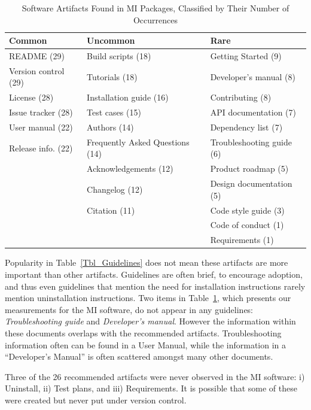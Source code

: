 \documentclass[draft, 12pt, 3p, times]{elsarticle} %
\begin{document}
\begin{table}[ht!]
    \caption{Software Artifacts Found in MI Packages, Classified by Their Number
    of Occurrences}
    \begin{center}
    \begin{tabular}{ p{3.8 cm} p{6.4 cm} p{4.5 cm}}
    \toprule
    Common & Uncommon & Rare \\
    \midrule
    README (29) & Build scripts (18) & Getting Started (9)\\
    Version control (29) & Tutorials (18) & Developer's manual (8)\\
    License (28) & Installation guide (16) & Contributing (8)\\
    Issue tracker (28) & Test cases (15) & API documentation (7)\\
    User manual (22) & Authors (14) & Dependency list (7)\\
    Release info. (22) & Frequently Asked Questions (14) & Troubleshooting guide (6)\\
     & Acknowledgements (12) & Product roadmap (5)\\
     & Changelog (12) & Design documentation (5)\\
     & Citation (11) & Code style guide (3)\\
     & & Code of conduct (1)\\
     & & Requirements (1)\\
    \bottomrule
    \end{tabular}
    \label{artifactspresent}
    \end{center}
\end{table}

Popularity in Table~\ref{Tbl_Guidelines} does not mean these 
artifacts are more important than other artifacts. Guidelines are often brief, to
encourage adoption, and thus even guidelines that mention the need for
installation instructions rarely mention uninstallation instructions.  Two items
in Table~\ref{artifactspresent}, which presents our measurements for the MI
software, do not appear in any guidelines: \emph{Troubleshooting guide} and
\emph{Developer's manual}.  However the information within these documents
overlaps with the recommended artifacts.  Troubleshooting information often can
be found in a User Manual, while the information in a ``Developer's Manual'' is
often scattered amongst many other documents.

Three of the 26 recommended artifacts were never observed in the MI software:
i) Uninstall, ii) Test plans, and iii) Requirements. It is possible that
some of these were created but never put under version control.
\end{document}
